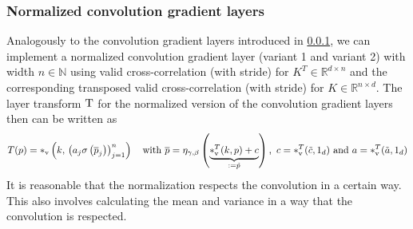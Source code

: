 \documentclass[twoside,a4paper]{article}
\begin{document}
\subsubsection{Normalized convolution gradient layers}\label{sec_conv_gradient_layer}

Analogously to the convolution gradient layers introduced in \cref{sec_conv_gradient_layer},
we can implement a normalized convolution gradient layer (variant 1 and variant 2) 
with width $n \in \mathbb{N}$
using valid cross-correlation (with stride) for $K^T \in \mathbb{R}^{d \times n}$ and the
corresponding transposed valid cross-correlation (with stride) for $K \in \mathbb{R}^{n \times d}$.
The layer transform $\mathrm{T}$ for the normalized version of the convolution gradient
layers then can be written as
\begin{equation*}
	T(p) = *_{\text{v}} \left( k, \, \left( a_j \sigma \left( \overline{p}_j \right) \right)_{j=1}^n \right) 
	\quad
	\text{with } \overline{p} = 
	\eta_{\gamma, \beta} \left( \underbrace{*_{\text{v}}^T(k,p) + c}_{:= \tilde{p}} \right)
	\text{, }\, c = *_{\text{v}}^T(\tilde{c},1_d) 
	\text{ and } a = *_{\text{v}}^T(\tilde{a},1_d)
\end{equation*}
It is reasonable that the normalization respects the convolution in a certain way.
This also involves calculating the mean and variance in a way that the convolution is respected.
\end{document}

